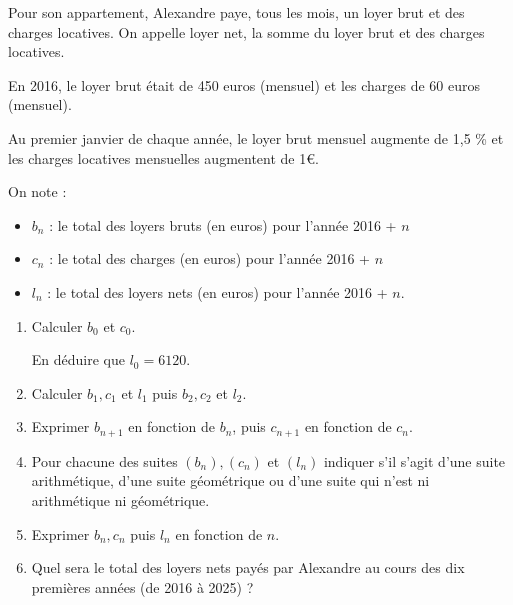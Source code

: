 
%
Pour son appartement, Alexandre paye, tous les mois, un loyer brut et des charges locatives. On appelle loyer net, la somme du loyer brut et des charges locatives.
\par
En 2016, le loyer brut était de 450 euros (mensuel) et les charges de 60 euros (mensuel).
\par
Au premier janvier de chaque année, le loyer brut mensuel augmente de 1,5 \% et les charges locatives mensuelles augmentent de 1€.
\par
On note :
\begin{itemize}
     \item
     $b_n$ : le total des loyers bruts (en euros) pour l'année 2016 + $n$
     \item
     $c_n$ : le total des charges (en euros) pour l'année 2016 + $n$
     \item
     $l_n$ : le total des loyers nets (en euros) pour l'année 2016 + $n$.
\end{itemize}
\begin{enumerate}
     \item
     Calculer $b_0$ et $c_0$.
     \par
     En déduire que $l_0=6120$.
     \item
     Calculer $b_1, c_1$ et $l_1$ puis $b_2, c_2$ et $l_2$.
     \item
     Exprimer $b_{n+1}$ en fonction de $b_n$, puis $c_{n+1}$ en fonction de $c_n$.
     \item
     Pour chacune des suites $(b_n), (c_n)$ et $(l_n)$ indiquer s'il s'agit d'une suite arithmétique, d'une suite géométrique ou d'une suite qui n'est ni arithmétique ni géométrique.
     \item
     Exprimer $b_n, c_n$ puis $l_n$ en fonction de $n$.
     \item
     Quel sera le total des loyers nets payés par Alexandre au cours des dix premières années (de 2016 à 2025) ?
\end{enumerate}

